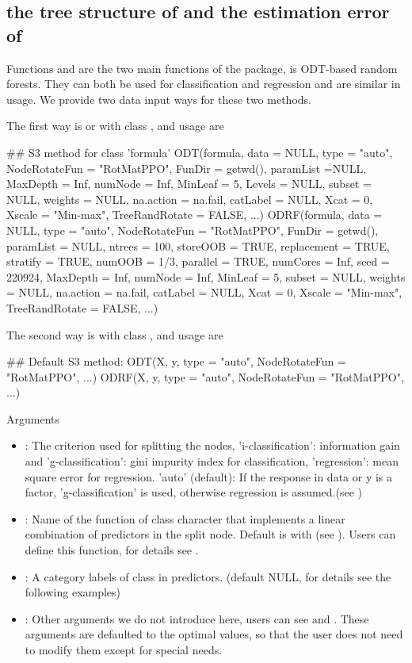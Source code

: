 \documentclass[nojss]{jss}
\newcommand{\fct}[1]{\code{#1()}}
\numberwithin{equation}{section}
\begin{document}
\subsection[print the tree structure of ODT and the estimation error of ODRF]{ the tree structure of  and the estimation error of }
Functions \fct{ODT} and \fct{ODRF} are the two main functions of the  package, \fct{ODRF} is ODT-based random forests. They can both be used for classification and regression and are similar in usage. We provide two data input ways for these two  methods.

The first way is  or  with class , and usage are
\begin{Code}
## S3 method for class 'formula'
ODT(formula, data = NULL, type = "auto", NodeRotateFun = "RotMatPPO", 
  FunDir = getwd(), paramList =NULL, MaxDepth = Inf, numNode = Inf, 
  MinLeaf = 5, Levels = NULL, subset = NULL, weights = NULL,
  na.action = na.fail, catLabel = NULL, Xcat = 0, Xscale = "Min-max", 
  TreeRandRotate = FALSE, ...)
ODRF(formula, data = NULL, type = "auto", NodeRotateFun = "RotMatPPO",
  FunDir = getwd(), paramList = NULL, ntrees = 100, storeOOB = TRUE,
  replacement = TRUE, stratify = TRUE, numOOB = 1/3, parallel = TRUE,
  numCores = Inf, seed = 220924, MaxDepth = Inf, numNode = Inf,
  MinLeaf = 5, subset = NULL, weights = NULL, na.action = na.fail,
  catLabel = NULL, Xcat = 0, Xscale = "Min-max", TreeRandRotate = FALSE, ...)
\end{Code}
The second way is  with class , and usage are
\begin{Code}
## Default S3 method:
ODT(X, y, type = "auto", NodeRotateFun = "RotMatPPO", ...)
ODRF(X, y, type = "auto", NodeRotateFun = "RotMatPPO", ...)
\end{Code}
Arguments
\begin{itemize}
	\item {}: The criterion used for splitting the nodes, 'i-classification': information gain and 'g-classification': gini impurity index for classification, 'regression': mean square error for regression. 'auto' (default): If the response in data or y is a factor, 'g-classification' is used, otherwise regression is assumed.(see )
	\item {}: Name of the function of class character that implements a linear combination of predictors in the split node. Default is  with  (see ). Users can define this function, for details see .
	\item {}: A category labels of class  in predictors. (default NULL, for details see the following examples)
	\item {}: Other arguments we do not introduce here, users can see  and . These arguments are defaulted to the optimal values, so that the user does not need to modify them except for special needs.
\end{itemize}
\end{document}
